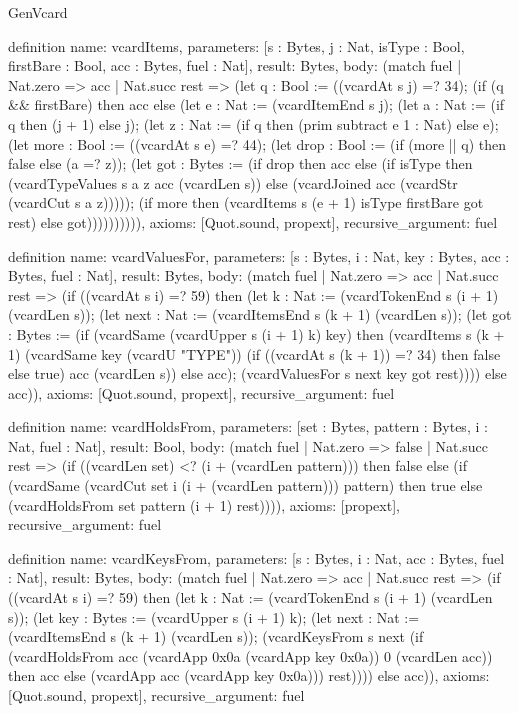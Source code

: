 \begin{lexlean}{GenVcard}
\begin{semanticmodule}
definition{
  name: vcardItems,
  parameters: [s : Bytes, j : Nat, isType : Bool, firstBare : Bool, acc : Bytes, fuel : Nat],
  result: Bytes,
  body: (match fuel
    | Nat.zero => acc
    | Nat.succ rest => (let q : Bool := ((vcardAt s j) =? 34); (if (q && firstBare) then acc else (let e : Nat := (vcardItemEnd s j); (let a : Nat := (if q then (j + 1) else j); (let z : Nat := (if q then (prim subtract e 1 : Nat) else e); (let more : Bool := ((vcardAt s e) =? 44); (let drop : Bool := (if (more || q) then false else (a =? z)); (let got : Bytes := (if drop then acc else (if isType then (vcardTypeValues s a z acc (vcardLen s)) else (vcardJoined acc (vcardStr (vcardCut s a z))))); (if more then (vcardItems s (e + 1) isType firstBare got rest) else got)))))))))),
  axioms: [Quot.sound, propext],
  recursive_argument: fuel
}

definition{
  name: vcardValuesFor,
  parameters: [s : Bytes, i : Nat, key : Bytes, acc : Bytes, fuel : Nat],
  result: Bytes,
  body: (match fuel
    | Nat.zero => acc
    | Nat.succ rest => (if ((vcardAt s i) =? 59) then (let k : Nat := (vcardTokenEnd s (i + 1) (vcardLen s)); (let next : Nat := (vcardItemsEnd s (k + 1) (vcardLen s)); (let got : Bytes := (if (vcardSame (vcardUpper s (i + 1) k) key) then (vcardItems s (k + 1) (vcardSame key (vcardU "TYPE")) (if ((vcardAt s (k + 1)) =? 34) then false else true) acc (vcardLen s)) else acc); (vcardValuesFor s next key got rest)))) else acc)),
  axioms: [Quot.sound, propext],
  recursive_argument: fuel
}

definition{
  name: vcardHoldsFrom,
  parameters: [set : Bytes, pattern : Bytes, i : Nat, fuel : Nat],
  result: Bool,
  body: (match fuel
    | Nat.zero => false
    | Nat.succ rest => (if ((vcardLen set) <? (i + (vcardLen pattern))) then false else (if (vcardSame (vcardCut set i (i + (vcardLen pattern))) pattern) then true else (vcardHoldsFrom set pattern (i + 1) rest)))),
  axioms: [propext],
  recursive_argument: fuel
}

definition{
  name: vcardKeysFrom,
  parameters: [s : Bytes, i : Nat, acc : Bytes, fuel : Nat],
  result: Bytes,
  body: (match fuel
    | Nat.zero => acc
    | Nat.succ rest => (if ((vcardAt s i) =? 59) then (let k : Nat := (vcardTokenEnd s (i + 1) (vcardLen s)); (let key : Bytes := (vcardUpper s (i + 1) k); (let next : Nat := (vcardItemsEnd s (k + 1) (vcardLen s)); (vcardKeysFrom s next (if (vcardHoldsFrom acc (vcardApp 0x0a (vcardApp key 0x0a)) 0 (vcardLen acc)) then acc else (vcardApp acc (vcardApp key 0x0a))) rest)))) else acc)),
  axioms: [Quot.sound, propext],
  recursive_argument: fuel
}


\end{semanticmodule}
\end{lexlean}
